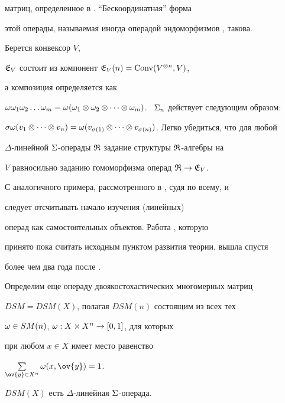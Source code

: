 матриц, определенное в \cite{Gas}. ``Бескоординатная'' форма


этой операды, называемая иногда операдой эндоморфизмов \cite{GK}, такова.


Берется конвексор $V$,


$\frak E_V$ состоит из компонент $\frak E_V(n)=\operatorname{Conv}(V^{\otimes n}, V)$,


а композиция определяется как


$\o\o_1\o_2\dotsc\o_m=\o(\o_1\otimes\o_2\otimes\dotsb


\otimes \o_m)$. \ $\sym_n$ действует следующим образом:


$\s \o(v_1\otimes\dotsb\otimes v_n)=\o(v_{\s (1)}\otimes\dotsb


\otimes v_{\s (n)})$. Легко убедиться, что для любой


$\Delta$-линейной $\Sigma$-операды $\frak R$ задание структуры $\frak R$-алгебры на


$V$ равносильно заданию гомоморфизма операд $\frak R\to \frak E_V$.





С аналогичного примера, рассмотренного в \cite{Art}, судя по всему, и


следует отсчитывать начало изучения (линейных)


операд как самостоятельных объектов. Работа \cite{May}, которую


принято пока считать исходным пунктом развития теории, вышла спустя


более чем два года после \cite{Art}.





Определим еще операду двоякостохастических многомерных матриц


$DSM=DSM(X)$, полагая $DSM(n)$ состоящим из всех тех


$\omega\in SM(n)$, $\omega:X\times X^n\to [0,1]$, для которых


при любом $x\in X$ имеет место равенство


$\sum\limits_{\ov{y} \in X^n} \o(x,\ov{y})=1$.





\begin{thm}


$DSM(X)$ есть $\Delta$-линейная $\Sigma$-операда.


\end{thm}





